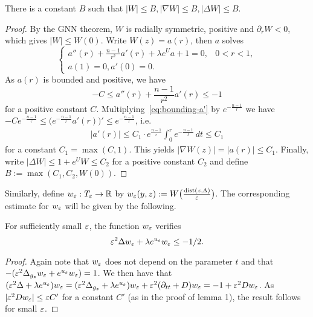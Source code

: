 \begin{lemma} There is a constant $B$ such that $|W|\leq B, |\nabla W|\leq
    B, |\Delta W|\leq B$.
\end{lemma}
\begin{proof}
    By the GNN theorem, $W$ is radially symmetric, positive and $\partial_r W<0$,
    which gives $|W|\leq W(0)$. Write $W(z)=a(r)$, then $a$ solves
    \begin{equation}
        \left\{
            \begin{array}{lc}
                a''(r)+\frac{n-1}{r^2}a'(r)+\lambda e^{U}a+1=0, & 0<r<1,\\
                a(1) = 0, a'(0) = 0. &
            \end{array}
        \right.
    \end{equation}
    As $a(r)$ is bounded and positive, we have
    \begin{equation}
        \label{eq:bounding-a'}
        -C\leq a''(r)+\frac{n-1}{r^2}a'(r)\leq -1
    \end{equation}
    for a positive constant $C$.
    Multiplying~\ref{eq:bounding-a'} by $e^{-\frac{n-1}{r}}$ we have $
    -Ce^{-\frac{n-1}{r}}\leq \big(e^{-\frac{n-1}{r}}a'(r)\big)'\leq
    e^{-\frac{n-1}{r}}$, i.e.
    \begin{eqnarray*}
        |a'(r)|\leq  C_1\cdot e^{\frac{n-1}{r}}\int_0^{r}e^{-\frac{n-1}{t}}\, dt \leq
        C_1
    \end{eqnarray*}
    for a constant $C_1=\max(C,1)$. This yields $|\nabla W(z)|=|a(r)|\leq C_1$.
    Finally, write $|\Delta W|\leq 1+e^{U}W\leq C_2$ for a positive constant $C_2$
    and define $B:=\max(C_1,C_2,W(0))$.

\end{proof}

Similarly, define $w_\varepsilon:T_\varepsilon\to \mathbb{R}$ by
$w_\varepsilon(y,z):=W\big(\frac{\operatorname{dist}(z,\Lambda)}{\varepsilon}\big)$. The
corresponding estimate for $w_\varepsilon$ will be given by the following. 

\begin{lemma}
    For sufficiently small $\varepsilon$, the function $w_\varepsilon$ verifies
    \begin{equation}
        \label{eq-lemma--1/2}
        \varepsilon^2 \Delta w_\varepsilon + \lambda e^{u_\varepsilon}w_\varepsilon \leq -1/2.
    \end{equation}
\end{lemma}

\begin{proof}
    Again note that $w_\varepsilon$ does not depend on the parameter $t$ and that
    $-(\varepsilon^2\Delta_{g_z}w_\varepsilon + e^{u_\varepsilon}w_\varepsilon)=1$. We then have that $(\varepsilon^2\Delta
    + \lambda e^{u_\varepsilon})w_\varepsilon = (\varepsilon^2\Delta_{g_z}+\lambda
    e^{u_\varepsilon})w_\varepsilon+\varepsilon^2(\partial_{tt} + D)w_\varepsilon = -1+\varepsilon^2Dw_\varepsilon$. As $|\varepsilon^2
    Dw_\varepsilon|\leq \varepsilon C'$ for a constant $C'$ (as in the proof of lemma 1), the
    result follows for small $\varepsilon$.
\end{proof}

